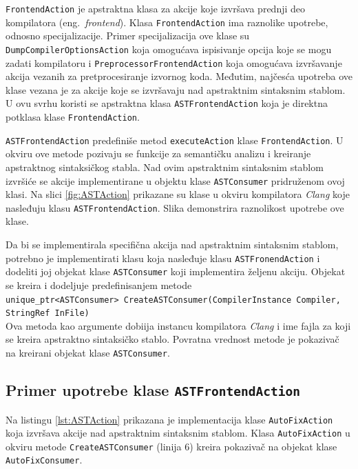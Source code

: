 \documentclass[12pt,oneside]{memoir}
\begin{document}
\texttt{FrontendAction} je apstraktna klasa za akcije koje izvr\v{s}ava prednji deo kompilatora (eng.~\textit{frontend}).
Klasa \texttt{FrontendAction} ima raznolike upotrebe, odnosno specijalizacije. Primer specijalizacija ove klase su \texttt{DumpCompiler\-OptionsAction}
koja omogu\'{c}ava ispisivanje opcija koje se mogu zadati kompilatoru i \texttt{PreprocessorFrontendAction} koja omogu\'{c}ava izvr\v{s}avanje akcija vezanih za pretprocesiranje izvornog koda. Međutim, naj\v{c}es\'{c}a upotreba ove klase vezana je za akcije koje se izvr\v{s}avaju nad apstraktnim sintaksnim stablom. U ovu svrhu koristi se apstraktna klasa \texttt{ASTFrontendAction} koja je direktna potklasa klase \texttt{FrontendAction}. \par
\texttt{ASTFrontendAction} predefini\v{s}e metod \texttt{executeAction} klase \texttt{FrontendAction}. U okviru ove metode pozivaju se funkcije za semanti\v{c}ku analizu i kreiranje apstraktnog sintaksi\v{c}kog stabla. Nad ovim apstraktnim sintaksnim stablom izvr\v{s}i\'{c}e se akcije implementirane u objektu klase \texttt{ASTConsumer} pridru\v{z}enom ovoj klasi.
Na slici \ref{fig:ASTAction} prikazane su klase u okviru kompilatora \textit{Clang} koje nasleđuju klasu \texttt{ASTFrontendAction}. Slika demonstrira raznolikost upotrebe ove klase. \par
Da bi se implementirala specifi\v{c}na akcija nad apstraktnim sintaksnim stablom, potrebno je implementirati klasu koja nasleđuje klasu \texttt{ASTFronendAction} i dodeliti joj objekat klase \texttt{ASTConsumer} koji implementira \v{z}eljenu akciju. Objekat se kreira i dodeljuje predefinisanjem metode \\ 
\texttt{unique\_ptr<ASTConsumer> CreateASTConsumer(CompilerInstance Compiler,} \\
\hspace*{9cm} \texttt{StringRef InFile)} \\ 
Ova metoda kao argumente dobiija instancu kompilatora \textit{Clang} i ime fajla za koji se kreira apstraktno sintaksi\v{c}ko stablo. Povratna vrednost metode je pokaziva\v{c} na kreirani objekat klase \texttt{ASTConsumer}.
\subsection{Primer upotrebe klase \texttt{ASTFrontendAction}}
Na listingu \ref{lst:ASTAction} prikazana je implementacija klase \texttt{AutoFixAction} koja izvr\v{s}ava akcije nad apstraktnim sintaksnim stablom.
Klasa \texttt{AutoFixAction} u okviru metode \texttt{CreateASTConsumer} (linija 6) kreira pokaziva\v{c} na objekat klase \texttt{AutoFixConsumer}.
\end{document}
